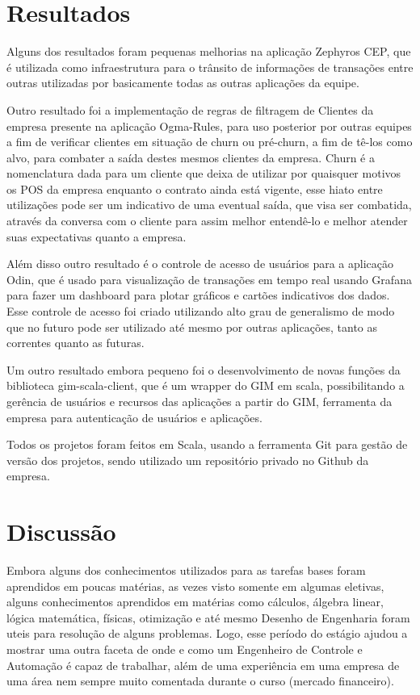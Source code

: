 \documentclass[a4paper]{article}
\begin{document}
\section{Resultados} 
Alguns dos resultados foram pequenas melhorias na aplicação Zephyros CEP, que
é utilizada como infraestrutura para o trânsito de informações de
transações entre outras utilizadas por basicamente todas as outras
aplicações da equipe.

Outro resultado foi a implementação de regras de filtragem de Clientes da empresa
presente na aplicação Ogma-Rules, para uso posterior por outras
equipes a fim de verificar clientes em situação de churn ou pré-churn,
a fim de tê-los como alvo, para combater a saída destes mesmos
clientes da empresa. Churn é
a nomenclatura dada para um cliente que deixa de utilizar por
quaisquer motivos os \gls{POS} da empresa enquanto o contrato ainda está
vigente, esse hiato entre utilizações pode ser um indicativo de uma
eventual saída, que visa ser combatida, através da conversa com o cliente para assim
melhor entendê-lo e melhor atender suas expectativas quanto a empresa.

Além disso outro resultado é o controle de acesso de usuários
para a aplicação Odin, que é usado para visualização de transações em
tempo real usando Grafana para fazer um dashboard para plotar gráficos
e cartões indicativos dos dados. Esse controle de acesso foi criado
utilizando alto grau de generalismo de modo que no futuro pode ser
utilizado até mesmo por outras aplicações, tanto as correntes quanto
as futuras. 

Um outro resultado embora pequeno foi o desenvolvimento de novas
funções da biblioteca gim-scala-client, que é um wrapper do GIM em
scala, possibilitando a gerência de usuários e recursos das
aplicações a partir do GIM, ferramenta da empresa para autenticação de
usuários e aplicações.

Todos os projetos foram feitos em Scala, usando a ferramenta Git para gestão de
versão dos projetos, sendo utilizado um repositório privado no Github
da empresa.

\section{Discussão}

Embora alguns dos conhecimentos utilizados para as tarefas bases foram
aprendidos em poucas matérias, as vezes visto somente em algumas
eletivas, alguns conhecimentos aprendidos em matérias como cálculos,
álgebra linear, lógica matemática, físicas, otimização e até mesmo
Desenho de Engenharia foram uteis para resolução de alguns
problemas. Logo, esse período do estágio ajudou a mostrar uma outra
faceta de onde e como um Engenheiro de Controle e Automação é capaz de
trabalhar, além de uma experiência em uma empresa de uma área nem
sempre muito comentada durante o curso (mercado financeiro).
\end{document}
